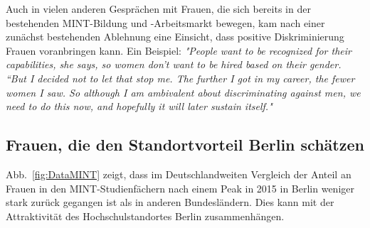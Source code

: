\documentclass[a4paper, 12 pt]{IEEEtran}
\begin{document}
Auch in vielen anderen Gesprächen mit Frauen, die sich bereits in der bestehenden MINT-Bildung und -Arbeitsmarkt bewegen, kam nach einer zunächst bestehenden Ablehnung eine Einsicht, dass positive Diskriminierung Frauen voranbringen kann. Ein Beispiel:
\emph{"People want to be recognized for their capabilities, she says, so women don’t want to be hired based on their gender. “But I decided not to let that stop me. The further I got in my career, the fewer women I saw. So although I am ambivalent about discriminating against men, we need to do this now, and hopefully it will later sustain itself." \cite{Feder.2021}}


\subsection{Frauen, die den Standortvorteil Berlin schätzen}
Abb.~\ref{fig:DataMINT} zeigt, dass im  Deutschlandweiten Vergleich der Anteil an Frauen in den MINT-Studienfächern nach einem Peak in 2015 in Berlin weniger stark zurück gegangen ist  als in anderen Bundesländern. Dies kann mit der Attraktivität des Hochschulstandortes Berlin zusammenhängen.
\end{document}
